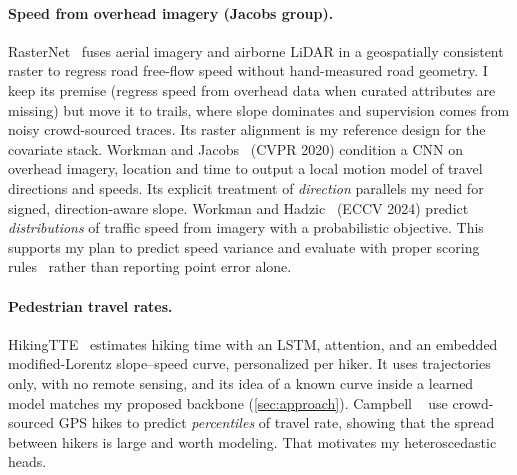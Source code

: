 \documentclass[10pt,twocolumn,letterpaper]{article}
\begin{document}
\paragraph{Speed from overhead imagery (Jacobs group).}
RasterNet~\cite{hadzic2020rasternet} fuses aerial imagery and airborne LiDAR in a geospatially consistent raster to regress road free-flow speed without hand-measured road geometry. I keep its premise (regress speed from overhead data when curated attributes are missing) but move it to trails, where slope dominates and supervision comes from noisy crowd-sourced traces. Its raster alignment is my reference design for the covariate stack.
Workman and Jacobs~\cite{workman2020dynamic} (CVPR 2020) condition a CNN on overhead imagery, location and time to output a local motion model of travel directions and speeds. Its explicit treatment of \emph{direction} parallels my need for signed, direction-aware slope.
Workman and Hadzic~\cite{workman2024probabilistic} (ECCV 2024) predict \emph{distributions} of traffic speed from imagery with a probabilistic objective. This supports my plan to predict speed variance and evaluate with proper scoring rules~\cite{gneiting2007strictly} rather than reporting point error alone.

\paragraph{Pedestrian travel rates.}
HikingTTE~\cite{asako2024hikingtte} estimates hiking time with an LSTM, attention, and an embedded modified-Lorentz slope--speed curve, personalized per hiker. It uses trajectories only, with no remote sensing, and its idea of a known curve inside a learned model matches my proposed backbone (\cref{sec:approach}).
Campbell \etal~\cite{campbell2022variability} use crowd-sourced GPS hikes to predict \emph{percentiles} of travel rate, showing that the spread between hikers is large and worth modeling. That motivates my heteroscedastic heads.
\end{document}
